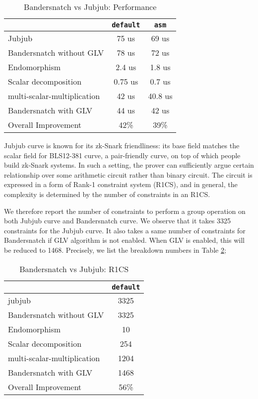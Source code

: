 \documentclass{article}
\newcommand{\ZZ}[1]{\color{cyan}#1\color{black}}
\theoremstyle{definition}
\begin{document}
\begin{table}[h] %
  \centering
  
  \begin{tabular}{|l|c|c|}\hline
      & \texttt{default} & \texttt{asm}\\\hline\hline
    Jubjub & 75 us & 69 us \\\hline
    Bandersnatch without GLV & 78 us & 72 us  \\\hline\hline   
    Endomorphism & 2.4 us& 1.8 us\\\hline
    Scalar decomposition & 0.75 us & 0.7 us \\\hline
    multi-scalar-multiplication & 42 us &  40.8 us\\\hline
    Bandersnatch with GLV& 44 us & 42 us \\\hline\hline
    Overall Improvement & 42\% & 39\% \\\hline
  \end{tabular}
  \caption{Bandersnatch vs Jubjub: Performance}
  \label{tab:comp_full}
\end{table}


Jubjub curve is known for its zk-Snark friendliness: its 
base field matches the scalar field for BLS12-381 curve, a 
pair-friendly curve, on top of which people build zk-Snark
systems.
In such a setting, the prover can sufficiently argue certain 
relationship over some arithmetic circuit rather than binary
circuit.
The circuit is expressed in a form of Rank-1 constraint system
(R1CS), and in general, the complexity is determined by the 
number of constraints in an R1CS. 

We therefore report the number of constraints to perform
a group operation on both Jubjub curve and Bandersnatch 
curve. We observe that it takes 3325 constraints for the 
Jubjub curve. It also takes a same number of constraints
for Bandersnatch if GLV algorithm is not enabled. 
When GLV is enabled, this will be reduced to 1468.
Precisely, we list the breakdown numbers in Table \ref{tab:r1cs_full};

\begin{table}[h] %
  \centering
  
  \begin{tabular}{|l|c|}\hline
      & \texttt{default} \\\hline\hline
      jubjub& 3325 \\\hline
      Bandersnatch without GLV& 3325 \\\hline\hline
    Endomorphism & 10 \\\hline
    Scalar decomposition & 254 \\\hline
    multi-scalar-multiplication & 1204 \\\hline
    Bandersnatch with GLV& 1468 \\\hline\hline
    Overall Improvement & 56\%   \\\hline
  \end{tabular}
  \caption{Bandersnatch vs Jubjub: R1CS}
  \label{tab:r1cs_full}
\end{table}
\end{document}
